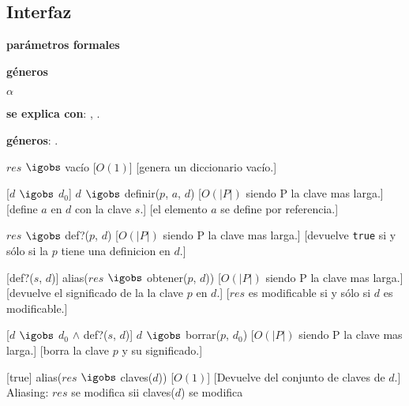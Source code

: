 
\begin{Interfaz}
\subsection{Interfaz}

  \textbf{par\'ametros formales}\parindent\\
  \parbox{1.7cm}{\textbf{g\'eneros}} $\alpha$
 
 
  \textbf{se explica con}: , .

  \textbf{g\'eneros}: .

  {$res$ $\igobs$ vac\'io}
  [$O(1)$]
  [genera un diccionario vac\'io.]

  [$d$ $\igobs$ $d_0$]
  {$d$ $\igobs$ definir($p$, $a$, $d$)}
  [$O(|P|)$ siendo P la clave mas larga.]
  [define $a$ en $d$ con la clave $s$.]
  [el elemento $a$ se define por referencia.]

  {$res$ $\igobs$ def?($p$, $d$)}
  [$O(|P|)$ siendo P la clave mas larga.]
  [devuelve \texttt{true} si y s\'olo si la $p$ tiene una definicion en $d$.]

  [def?($s$, $d$)]
  {alias($res$ $\igobs$ obtener($p$, $d$))}
  [$O(|P|)$ siendo P la clave mas larga.]
  [devuelve el significado de la la clave $p$ en $d$.]
  [$res$ es modificable si y s\'olo si $d$ es modificable.]

  [$d$ $\igobs$ $d_0$ $\land$ def?($s$, $d$)]
  {$d$ $\igobs$ borrar($p$, $d_0$)}
  [$O(|P|)$ siendo P la clave mas larga.]
  [borra la clave $p$ y su significado.]

  [true]
  {alias($res$ $\igobs$ claves($d$))}
  [$O(1)$]
  [Devuelve del conjunto de claves de $d$.]
  {Aliasing: $res$ se modifica sii claves($d$) se modifica}



\end{Interfaz}

\pagebreak

